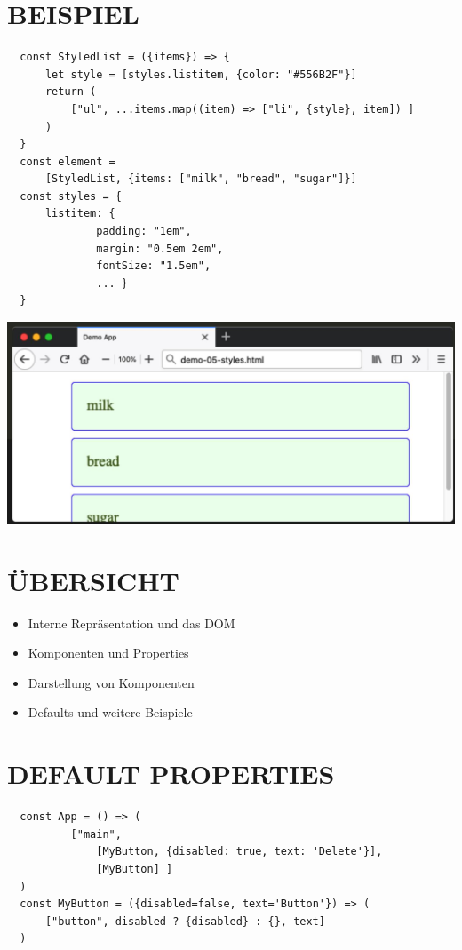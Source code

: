   \section*{BEISPIEL}
  \begin{verbatim}
  const StyledList = ({items}) => {
      let style = [styles.listitem, {color: "#556B2F"}]
      return (
          ["ul", ...items.map((item) => ["li", {style}, item]) ]
      )
  }
  const element =
      [StyledList, {items: ["milk", "bread", "sugar"]}]
  const styles = {
      listitem: {
              padding: "1em",
              margin: "0.5em 2em",
              fontSize: "1.5em",
              ... }
  }
  \end{verbatim}
  
  \begin{center}
  \includegraphics[width=\linewidth]{images/2025_01_02_254b5e4c52d090c313e1g-35}
  \end{center}
  
  \section*{ÜBERSICHT}
  \begin{itemize}
    \item Interne Repräsentation und das DOM
    \item Komponenten und Properties
    \item Darstellung von Komponenten
    \item Defaults und weitere Beispiele
  \end{itemize}
  
  \section*{DEFAULT PROPERTIES}
  \begin{verbatim}
  const App = () => (
          ["main",
              [MyButton, {disabled: true, text: 'Delete'}],
              [MyButton] ]
  )
  const MyButton = ({disabled=false, text='Button'}) => (
      ["button", disabled ? {disabled} : {}, text]
  )
  \end{verbatim}
  
